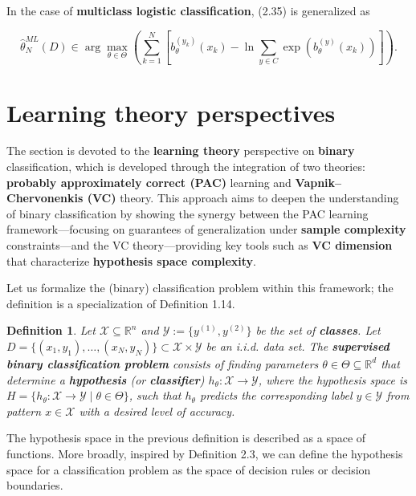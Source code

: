 \documentclass{report}
\newtheorem{definition}{Definition}[chapter]
\begin{document}
In the case of \textbf{multiclass logistic classification}, (2.35) is generalized as

\begin{equation}
\hat{\theta}^{ML}_N(D) \in \arg \max_{\theta \in \Theta} \left(
\sum_{k=1}^N\left[b_\theta^{(y_k)}(x_k) - \ln \sum_{y \in C} \exp(b_\theta^{(y)}(x_k))\right]\right).
\end{equation}

\section{Learning theory perspectives}
The section is devoted to the \textbf{learning theory} perspective on \textbf{binary} classification, which is developed through the integration of two theories: \textbf{probably approximately correct (PAC)} learning and \textbf{Vapnik–Chervonenkis (VC)} theory. This approach aims to deepen the understanding of binary classification by showing the synergy between the PAC learning framework—focusing on guarantees of generalization under \textbf{sample complexity} constraints—and the VC theory—providing key tools such as \textbf{VC dimension} that characterize \textbf{hypothesis space complexity}.

Let us formalize the (binary) classification problem within this framework; the definition is a specialization of Definition 1.14.

\begin{definition}
Let $\mathcal{X} \subseteq \mathbb{R}^n$ and $\mathcal{Y} := \{y^{(1)}, y^{(2)}\}$ be the set of \textbf{classes}. Let $D = \{(x_1,y_1), \dots, (x_N,y_N)\} \subset \mathcal{X} \times \mathcal{Y}$ be an i.i.d. data set. The \textbf{supervised binary classification problem} consists of finding parameters $\theta \in \Theta \subseteq \mathbb{R}^d$ that determine a \textbf{hypothesis} (or \textbf{classifier}) $h_\theta : \mathcal{X} \to \mathcal{Y}$, where the hypothesis space is $H = \{h_\theta : \mathcal{X} \to \mathcal{Y} \mid \theta \in \Theta\}$, such that $h_\theta$ predicts the corresponding label $y \in \mathcal{Y}$ from pattern $x \in \mathcal{X}$ with a desired level of accuracy.
\end{definition}

The hypothesis space in the previous definition is described as a space of functions. More broadly, inspired by Definition 2.3, we can define the hypothesis space for a classification problem as the space of decision rules or decision boundaries.
\end{document}
